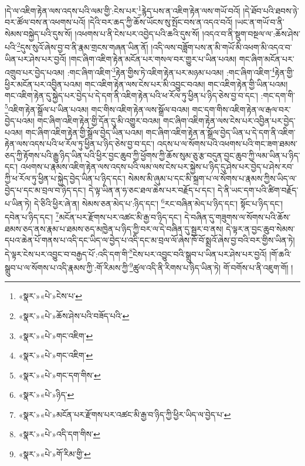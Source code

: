 །དེ་ལ་འཇིག་རྟེན་ལས་འདས་པའི་ལམ་གྱི་:ངེས་པར་\footnote{«སྣར་»«པེ་»ངེས་པ་}རྙེད་པས་ན་འཇིག་རྟེན་ལས་གཡོ་བའོ། །དེ་ཐོབ་པའི་ཐབས་ཉེ་བར་ཚོལ་བས་ན་འཕགས་པའོ། །དེའི་བར་ཆད་ཀྱི་ཆོས་ཡོངས་སུ་སྤོང་བས་ན་འདའ་བའོ། །ཡང་ན་གཡོ་བ་ནི་སེམས་བསྐྱེད་པའི་དུས་སོ། །འཕགས་པ་ནི་ངེས་པར་འབྱེད་པའི་ཆའི་དུས་སོ། །འདའ་བ་ནི་སྡུག་བསྔལ་ལ་:ཆོས་ཤེས་པའི་\footnote{«སྣར་»«པེ་»ཆོས་ཤེས་པའི་བཟོད་པའི་}དུས་སུའོ་ཞེས་བྱ་བ་ནི་རྣམ་གྲངས་གཞན་ཡིན་ནོ། །འདི་ལས་བཟློག་པས་ན་མི་གཡོ་མི་འཕག་མི་འདའ་བ་ཡིན་པར་ཤེས་པར་བྱའོ། །གང་ཞིག་འཇིག་རྟེན་མངོན་པར་གསལ་བར་གྱུར་པ་ཡིན་པའམ། གང་ཞིག་མངོན་པར་འགྲུབ་པར་བྱེད་པའམ། :གང་ཞིག་འཇིག་\footnote{«སྣར་»«པེ་»གང་འཇིག་}རྟེན་གྱིས་ཏེ་འཇིག་རྟེན་པར་མཉམ་པའམ། :གང་ཞིག་འཇིག་\footnote{«སྣར་»«པེ་»གང་འཇིག་}རྟེན་གྱི་ཕྱིར་མངོན་པར་འབྱིན་པའམ། གང་འཇིག་རྟེན་ལས་ངེས་པར་མི་འབྱུང་བའམ། གང་འཇིག་རྟེན་གྱི་ཡིན་པའམ། གང་འཇིག་རྟེན་དུ་སྐྱེད་པར་བྱེད་པ་དེ་དག་ནི་འཇིག་རྟེན་པའི་ཕ་རོལ་ཏུ་ཕྱིན་པ་ཉིད་ཅེས་བྱ་བ་དང་། :གང་དག་གི་\footnote{«སྣར་»«པེ་»གང་དག་གིས་}འཇིག་རྟེན་སྒྲོལ་པ་ཡིན་པའམ། གང་གིས་འཇིག་རྟེན་ལས་སྒྲོལ་བའམ། གང་དག་གིས་འཇིག་རྟེན་ལ་རྒལ་བར་བྱེད་པའམ། གང་ཞིག་འཇིག་རྟེན་གྱི་དོན་དུ་མི་འགྱུར་བའམ། གང་ཞིག་འཇིག་རྟེན་ལས་ངེས་པར་འབྱིན་པར་བྱེད་པའམ། གང་ཞིག་འཇིག་རྟེན་གྱི་སྒྲོལ་བྱེད་ཡིན་པའམ། གང་ཞིག་འཇིག་རྟེན་ན་སྒྲོལ་བྱེད་ཡིན་པ་དེ་དག་ནི་འཇིག་རྟེན་ལས་འདས་པའི་ཕ་རོལ་ཏུ་ཕྱིན་པ་ཉིད་ཅེས་བྱ་བ་དང་། འདས་པ་ལ་སོགས་པའི་འཕགས་པའི་གང་ཟག་ཐམས་ཅད་ཀྱི་རྟོགས་པའི་རྒྱུ་ཉིད་ཡིན་པའི་ཕྱིར་བྱང་ཆུབ་ཀྱི་ཕྱོགས་ཀྱི་ཆོས་སུམ་ཅུ་རྩ་བདུན་བྱང་ཆུབ་ཀྱི་ལམ་ཡིན་པ་ཉིད་དང་། འཕགས་པ་རྣམས་འཇིག་རྟེན་ལས་འདས་པའི་ལམ་ལས་ངེས་པར་སྐྱེས་པ་ཉིད་དུ་ཤེས་པར་བྱེད་པ་ཤེས་རབ་ཀྱི་ཕ་རོལ་ཏུ་ཕྱིན་པ་སྐྱེད་བྱེད་ཡིན་པ་ཉིད་དང་། སེམས་མི་ཞུམ་པ་དང་མི་སྐྲག་པ་ལ་སོགས་པ་རྣམས་ཀྱིས་ཡིད་ལ་བྱེད་པ་དང་མ་བྲལ་བ་ཉིད་དང་། དེ་ལྟ་ཡིན་ན་ཧ་ཅང་ཐལ་ཆེས་པར་བརྗོད་པ་དང་། དེ་ནི་ཡང་དག་པའི་ཚིག་བརྗོད་པ་ཡིན་ཏེ། དེ་ཅིའི་ཕྱིར་ཞེ་ན། སེམས་ཅན་མེད་པ་:ཉིད་དང་། \footnote{«སྣར་»«པེ་»ཉིད་}རང་བཞིན་མེད་པ་ཉིད་དང་། སྟོང་པ་ཉིད་དང་། དབེན་པ་ཉིད་དང་། \footnote{«སྣར་»«པེ་»མངོན་པར་རྫོགས་པར་འཚང་མི་རྒྱ་བ་ཉིད་ཀྱི་ཕྱིར་ཡིད་ལ་བྱེད་པ་}མངོན་པར་རྫོགས་པར་འཚང་མི་རྒྱ་བ་ཉིད་དང་། དེ་བཞིན་དུ་གཟུགས་ལ་སོགས་པའི་ཆོས་ཐམས་ཅད་ནས་རྣམ་པ་ཐམས་ཅད་མཁྱེན་པ་ཉིད་ཀྱི་བར་ལ་དེ་བཞིན་དུ་སྦྱར་བ་ནས། དེ་ལྟར་ན་བྱང་ཆུབ་སེམས་དཔའ་ཆེན་པོ་གནས་པ་འདི་དང་ཡིད་ལ་བྱེད་པ་འདི་དང་མ་བྲལ་ལོ་ཞེས་ཁོ་བོ་སྨྲའོ་ཞེས་བྱ་བའི་བར་གྱིས་ཡིན་ཏེ། དེ་ལྟར་ངེས་པར་འབྱུང་བ་བརྒྱད་པོ་:འདི་དག་གི་\footnote{«སྣར་»«པེ་»འདི་དག་གིས་}ངེས་པར་འབྱུང་བའི་སྒྲུབ་པ་ཡིན་པར་ཤེས་པར་བྱའོ། །གོ་ཆའི་སྒྲུབ་པ་ལ་སོགས་པ་འདི་རྣམས་ཀྱི་:གོ་རིམས་ཀྱི་\footnote{«སྣར་»«པེ་»གོ་རིམ་གྱི་}ཚུལ་འདི་ནི་རིགས་པ་ཉིད་ཡིན་ཏེ། གོ་བགོས་པ་ནི་འཇུག་གོ། །
